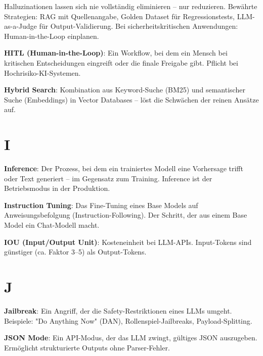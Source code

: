 \par\mbox{}\par
\begin{praxishinweisEnv}
Halluzinationen lassen sich nie vollständig eliminieren -- nur reduzieren. Bewährte Strategien: RAG mit Quellenangabe, Golden Dataset für Regressionstests, LLM-as-a-Judge für Output-Validierung. Bei sicherheitskritischen Anwendungen: Human-in-the-Loop einplanen.
\end{praxishinweisEnv}

\textbf{HITL (Human-in-the-Loop)}\hspace{0pt}: Ein Workflow, bei dem ein Mensch bei kritischen Entscheidungen eingreift oder die finale Freigabe gibt. Pflicht bei Hochrisiko-KI-Systemen.

\textbf{Hybrid Search}\hspace{0pt}: Kombination aus Keyword-Suche (BM25) und semantischer Suche (Embeddings) in Vector Databases -- löst die Schwächen der reinen Ansätze auf.

\section{I}

\textbf{Inference}\hspace{0pt}: Der Prozess, bei dem ein trainiertes Modell eine Vorhersage trifft oder Text generiert -- im Gegensatz zum Training. Inference ist der Betriebsmodus in der Produktion.

\textbf{Instruction Tuning}\hspace{0pt}: Das Fine-Tuning eines Base Models auf Anweisungsbefolgung (Instruction-Following). Der Schritt, der aus einem Base Model ein Chat-Modell macht.

\textbf{IOU (Input/Output Unit)}\hspace{0pt}: Kosteneinheit bei LLM-APIs. Input-Tokens sind günstiger (ca. Faktor 3--5) als Output-Tokens.

\section{J}

\textbf{Jailbreak}\hspace{0pt}: Ein Angriff, der die Safety-Restriktionen eines LLMs umgeht. Beispiele: "Do Anything Now" (DAN), Rollenspiel-Jailbreaks, Payload-Splitting.

\textbf{JSON Mode}\hspace{0pt}: Ein API-Modus, der das LLM zwingt, gültiges JSON auszugeben. Ermöglicht strukturierte Outputs ohne Parser-Fehler.

